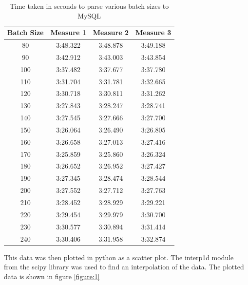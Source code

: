 \documentclass{article}
\begin{document}
\begin{table}[h!]
	\centering
	\begin{tabular}{||c c c c||}
		\hline
		Batch Size & Measure 1 & Measure 2 & Measure 3 \\ [0.5ex]
		\hline\hline
		80 & 3:48.322 & 3:48.878 & 3:49.188 \\ [0.5ex]
		\hline
		90 & 3:42.912 & 3:43.003 & 3:43.854 \\ [0.5ex]
		\hline
		100 & 3:37.482 & 3:37.677 & 3:37.780 \\ [0.5ex]
		\hline
		110 & 3:31.704 & 3:31.781 & 3:32.665 \\ [0.5ex]
		\hline
		120 & 3:30.718 & 3:30.811 & 3:31.262 \\ [0.5ex]
		\hline
		130 & 3:27.843 & 3:28.247 & 3:28.741 \\ [0.5ex]
		\hline
		140 & 3:27.545 & 3:27.666 & 3:27.700 \\ [0.5ex]
		\hline
		150 & 3:26.064 & 3:26.490 & 3:26.805 \\ [0.5ex]
		\hline
		160 & 3:26.658 & 3:27.013 & 3:27.416 \\ [0.5ex]
		\hline
		170 & 3:25.859 & 3:25.860 & 3:26.324 \\ [0.5ex]
		\hline
		180 & 3:26.652 & 3:26.952 & 3:27.427 \\ [0.5ex]
		\hline
		190 & 3:27.345 & 3:28.474 & 3:28.544 \\ [0.5ex]
		\hline
		200 & 3:27.552 & 3:27.712 & 3:27.763 \\ [0.5ex]
		\hline
		210 & 3:28.452 & 3:28.929 & 3:29.221 \\ [0.5ex]
		\hline
		220 & 3:29.454 & 3:29.979 & 3:30.700 \\ [0.5ex]
		\hline
		230 & 3:30.577 & 3:30.894 & 3:31.414 \\ [0.5ex]
		\hline
		240 & 3:30.406 & 3:31.958 & 3:32.874 \\ [0.5ex]
		\hline
	\end{tabular}
	\caption{Time taken in seconds to parse various batch sizes to MySQL}
	\label{table:1}
\end{table}

This data was then plotted in python as a scatter plot.  The interp1d module
from the scipy library was used to find an interpolation of the data.  The
plotted data is shown in figure \ref{figure:1}
\end{document}

